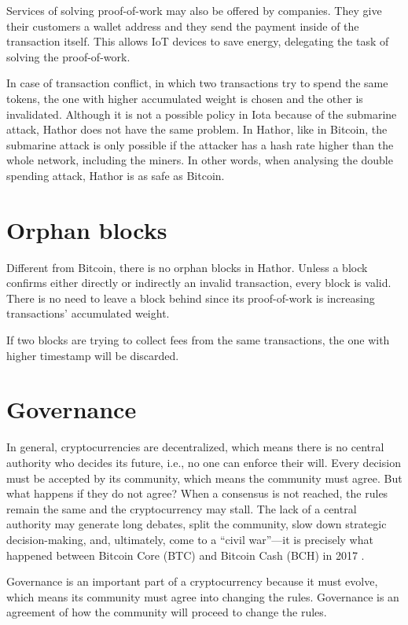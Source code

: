 Services of solving proof-of-work may also be offered by companies. They give their customers a wallet address and they send the payment inside of the transaction itself. This allows IoT devices to save energy, delegating the task of solving the proof-of-work.

In case of transaction conflict, in which two transactions try to spend the same tokens, the one with higher accumulated weight is chosen and the other is invalidated. Although it is not a possible policy in Iota because of the submarine attack, Hathor does not have the same problem. In Hathor, like in Bitcoin, the submarine attack is only possible if the attacker has a hash rate higher than the whole network, including the miners. In other words, when analysing the double spending attack, Hathor is as safe as Bitcoin.


\section{Orphan blocks}

Different from Bitcoin, there is no orphan blocks in Hathor. Unless a block confirms either directly or indirectly an invalid transaction, every block is valid. There is no need to leave a block behind since its proof-of-work is increasing transactions' accumulated weight.

If two blocks are trying to collect fees from the same transactions, the one with higher timestamp will be discarded.


\section{Governance}

In general, cryptocurrencies are decentralized, which means there is no central authority who decides its future, i.e., no one can enforce their will. Every decision must be accepted by its community, which means the community must agree. But what happens if they do not agree? When a consensus is not reached, the rules remain the same and the cryptocurrency may stall. The lack of a central authority may generate long debates, split the community, slow down strategic decision-making, and, ultimately, come to a ``civil war''---it is precisely what happened between Bitcoin Core (BTC) and Bitcoin Cash (BCH) in 2017 \citep{bloomberg2017civilwar, forbes2017civilwar}.

Governance is an important part of a cryptocurrency because it must evolve, which means its community must agree into changing the rules. Governance is an agreement of how the community will proceed to change the rules.

